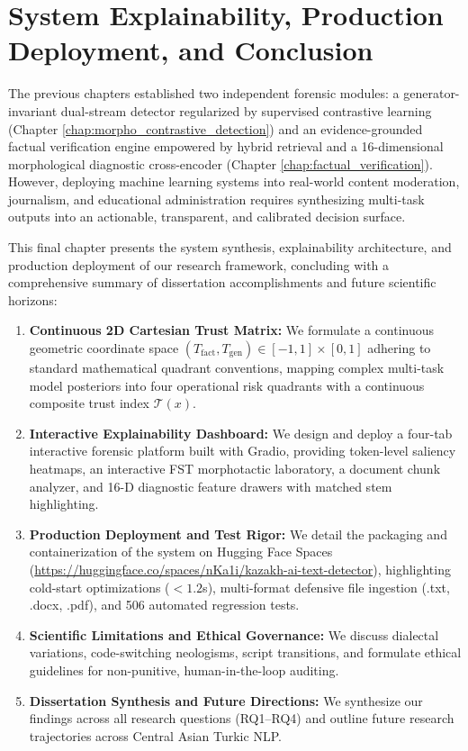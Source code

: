 \chapter{System Explainability, Production Deployment, and Conclusion}
\label{chap:system_explainability}

The previous chapters established two independent forensic modules: a generator-invariant dual-stream detector regularized by supervised contrastive learning (Chapter \ref{chap:morpho_contrastive_detection}) and an evidence-grounded factual verification engine empowered by hybrid retrieval and a 16-dimensional morphological diagnostic cross-encoder (Chapter \ref{chap:factual_verification}). However, deploying machine learning systems into real-world content moderation, journalism, and educational administration requires synthesizing multi-task outputs into an actionable, transparent, and calibrated decision surface.

This final chapter presents the system synthesis, explainability architecture, and production deployment of our research framework, concluding with a comprehensive summary of dissertation accomplishments and future scientific horizons:
\begin{enumerate}
    \item \textbf{Continuous 2D Cartesian Trust Matrix:} We formulate a continuous geometric coordinate space $(T_{\text{fact}}, T_{\text{gen}}) \in [-1, 1] \times [0, 1]$ adhering to standard mathematical quadrant conventions, mapping complex multi-task model posteriors into four operational risk quadrants with a continuous composite trust index $\mathcal{T}(x)$.
    \item \textbf{Interactive Explainability Dashboard:} We design and deploy a four-tab interactive forensic platform built with Gradio, providing token-level saliency heatmaps, an interactive FST morphotactic laboratory, a document chunk analyzer, and 16-D diagnostic feature drawers with matched stem highlighting.
    \item \textbf{Production Deployment and Test Rigor:} We detail the packaging and containerization of the system on Hugging Face Spaces (\url{https://huggingface.co/spaces/nKa1i/kazakh-ai-text-detector}), highlighting cold-start optimizations ($<1.2$s), multi-format defensive file ingestion (.txt, .docx, .pdf), and 506 automated regression tests.
    \item \textbf{Scientific Limitations and Ethical Governance:} We discuss dialectal variations, code-switching neologisms, script transitions, and formulate ethical guidelines for non-punitive, human-in-the-loop auditing.
    \item \textbf{Dissertation Synthesis and Future Directions:} We synthesize our findings across all research questions (RQ1--RQ4) and outline future research trajectories across Central Asian Turkic NLP.
\end{enumerate}

